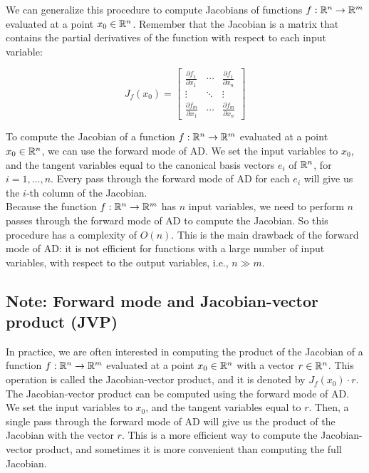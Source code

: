 We can generalize this procedure to compute Jacobians of functions $f: \mathbb{R}^n \to \mathbb{R}^m$ evaluated
at a point $x_0 \in \mathbb{R}^n$. Remember that the Jacobian is a matrix that contains the partial
derivatives of the function with respect to each input variable:

\begin{equation}
    J_f(x_0) = \begin{bmatrix}
        \frac{\partial f_1}{\partial x_1} & \cdots & \frac{\partial f_1}{\partial x_n} \\
        \vdots & \ddots & \vdots \\
        \frac{\partial f_m}{\partial x_1} & \cdots & \frac{\partial f_m}{\partial x_n}
    \end{bmatrix}
\end{equation}
\vspace{1em}

To compute the Jacobian of a function $f: \mathbb{R}^n \to \mathbb{R}^m$ evaluated at a point $x_0 \in \mathbb{R}^n$,
we can use the forward mode of AD. We set the input variables to $x_0$, and the tangent variables
equal to the canonical basis vectors $e_i$ of $\mathbb{R}^n$, for $i = 1, ..., n$. Every pass through
the forward mode of AD for each $e_i$ will give us the $i$-th column of the Jacobian.\\

Because the function $f: \mathbb{R}^n \to \mathbb{R}^m$ has $n$ input variables, we need to perform $n$ passes
through the forward mode of AD to compute the Jacobian. So this procedure has a complexity of
$O(n)$. This is the main drawback of the forward mode of AD: it is not efficient for functions
with a large number of input variables, with respect to the output variables, i.e., $n \gg m$.\\

\subsection{Note: Forward mode and Jacobian-vector product (JVP)}

In practice, we are often interested in computing the product of the Jacobian of a function
$f: \mathbb{R}^n \to \mathbb{R}^m$ evaluated at a point $x_0 \in \mathbb{R}^n$ with a vector $r \in \mathbb{R}^n$. This operation
is called the Jacobian-vector product, and it is denoted by $J_f(x_0) \cdot r$.\\

The Jacobian-vector product can be computed using the forward mode of AD. We set the input variables
to $x_0$, and the tangent variables equal to $r$. Then, a single pass through the forward mode of AD
will give us the product of the Jacobian with the vector $r$. This is a more efficient way to compute
the Jacobian-vector product, and sometimes it is more convenient than computing the full Jacobian.

